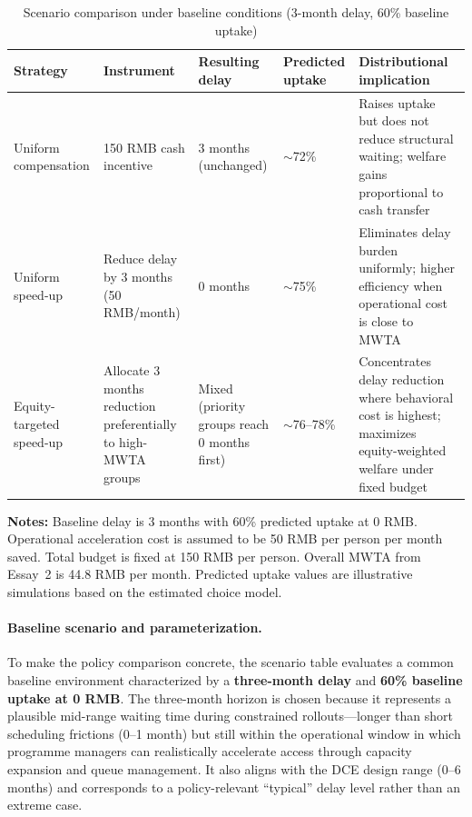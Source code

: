 \documentclass[doublespacing]{utdthesis}
\begin{document}
\begin{table}[htbp]
\centering
\caption{Scenario comparison under baseline conditions (3-month delay, 60\% baseline uptake)}
\label{tab:scenario_compare}
\begin{threeparttable}
\begin{tabular}{p{3.2cm} p{2.8cm} p{2.2cm} p{2.2cm} p{2.4cm}}
\toprule
\textbf{Strategy} & \textbf{Instrument} & \textbf{Resulting delay} & \textbf{Predicted uptake} & \textbf{Distributional implication} \\
\midrule
Uniform compensation 
& 150 RMB cash incentive 
& 3 months (unchanged) 
& $\sim$72\% 
& Raises uptake but does not reduce structural waiting; welfare gains proportional to cash transfer \\

Uniform speed-up 
& Reduce delay by 3 months (50 RMB/month) 
& 0 months 
& $\sim$75\% 
& Eliminates delay burden uniformly; higher efficiency when operational cost is close to MWTA \\

Equity-targeted speed-up 
& Allocate 3 months reduction preferentially to high-MWTA groups 
& Mixed (priority groups reach 0 months first) 
& $\sim$76--78\% 
& Concentrates delay reduction where behavioral cost is highest; maximizes equity-weighted welfare under fixed budget \\
\bottomrule
\end{tabular}

\begin{tablenotes}
\footnotesize
\item \textbf{Notes:} Baseline delay is 3 months with 60\% predicted uptake at 0 RMB. 
Operational acceleration cost is assumed to be 50 RMB per person per month saved. 
Total budget is fixed at 150 RMB per person. 
Overall MWTA from Essay~2 is 44.8 RMB per month. 
Predicted uptake values are illustrative simulations based on the estimated choice model.
\end{tablenotes}
\end{threeparttable}
\end{table}

\clearpage


\paragraph{Baseline scenario and parameterization.}
To make the policy comparison concrete, the scenario table evaluates a common baseline environment characterized by a \textbf{three-month delay} and \textbf{60\% baseline uptake at 0 RMB}. The three-month horizon is chosen because it represents a plausible mid-range waiting time during constrained rollouts—longer than short scheduling frictions (0--1 month) but still within the operational window in which programme managers can realistically accelerate access through capacity expansion and queue management. It also aligns with the DCE design range (0--6 months) and corresponds to a policy-relevant ``typical'' delay level rather than an extreme case.
\end{document}

